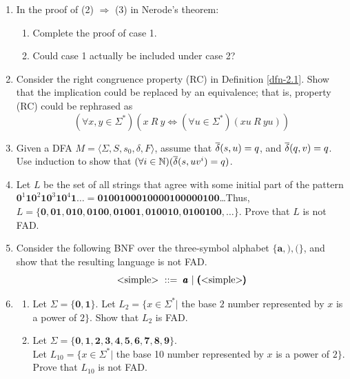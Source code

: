\begin{enumerate}[{2.}1.]
\item In the proof of (2) $\Rightarrow$ (3) in Nerode's theorem:
\begin{enumerate}
\item Complete the proof of case 1.
\item Could case 1 actually be included under case 2?
\end{enumerate}

\item Consider the right congruence property (RC) in Definition \ref{dfn-2.1}. Show that
the implication could be replaced by an equivalence; that is, property (RC)
could be rephrased as
\[ (\forall x,y \in \Sigma^*)(x\ R\ y \Leftrightarrow (\forall u \in \Sigma^*)
	(xu\ R\ yu)) \]

\item Given a DFA $M=\langle\Sigma,S,s_0,\delta,F\rangle$, assume that
$\overline{\delta}(s,u) = q$, and $\overline{\delta}(q,v) = q$. Use induction to show that
$(\forall i \in \mathbb{N})(\overline{\delta}(s,uv^i) = q)$.

\item Let $L$ be the set of all strings that agree with some initial part of the
pattern $\pmb{0}^1\pmb{10}^2\pmb{10}^3\pmb{10}^4\pmb{1} \ldots =
\pmb{0100100010000100000100}$\ldots Thus,
$L=\{\pmb{0},\pmb{01},\pmb{010},\pmb{0100},\pmb{01001},\pmb{010010},
\pmb{0100100},\ldots\}$. Prove that $L$ is not FAD.

\item Consider the following BNF over the three-symbol alphabet $\{\pmb{a},
\pmb{)},\pmb{(}\}$, and show that the resulting language is not FAD.
\[ \text{\<simple\>}\ ::=\ \pmb{a}\ |\ \pmb{(}\text{\<simple\>}\pmb{)} \]

\item \begin{enumerate}
\item Let $\Sigma=\{\pmb{0},\pmb{1}\}$. Let $L_2=\{x \in \Sigma^*|$ the base $2$
number represented by $x$ is a power of $2\}$. Show that $L_2$ is FAD.
\item Let $\Sigma=\{\pmb{0},\pmb{1},\pmb{2},\pmb{3},\pmb{4},\pmb{5},\pmb{6},
\pmb{7},\pmb{8},\pmb{9}\}$. \\
Let $L_{10}=\{x \in \Sigma^*|$ the base 10 number represented by $x$ is a power
of $2\}$. Prove that $L_{10}$ is not FAD.
\end{enumerate}
\end{enumerate}
